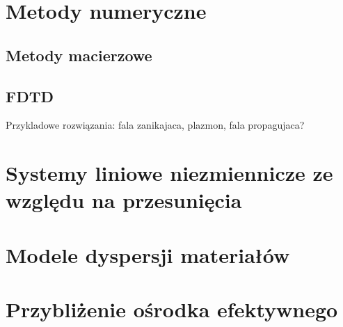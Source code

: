 \section{Metody numeryczne}
\subsection{Metody  macierzowe}
\subsection{FDTD}

Przykladowe rozwiązania: fala zanikajaca, plazmon, fala propagujaca?
\section{Systemy liniowe niezmiennicze ze względu na przesunięcia}

\section{Modele dyspersji materiałów}

\section{Przybliżenie ośrodka efektywnego}


